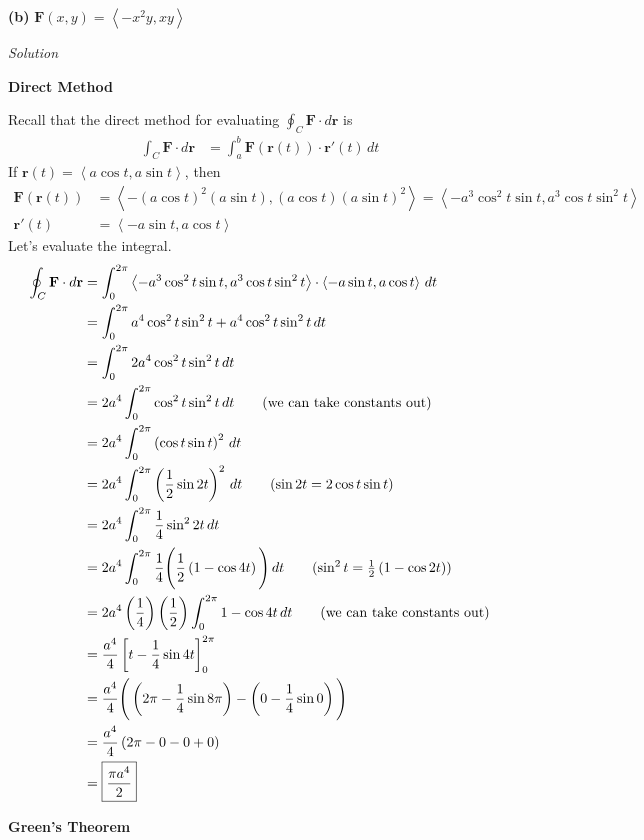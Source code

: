 \documentclass{article}
\newcommand{\lrp}[1]{\left( #1 \right)}
\newcommand{\lra}[1]{\left\langle #1 \right\rangle}
\newcommand{\lrb}[1]{\left[ #1 \right]}
\renewcommand{\r}[0]{\mathbf{r}}
\newcommand{\F}[0]{\mathbf{F}}
\newcommand{\Solution}{\textit{Solution}}
\begin{document}
{}\textbf{(b)} $\F(x,y)=\lra{-x^2y,xy}$

\Solution

{}\textbf{Direct Method}

Recall that the direct method for evaluating $\displaystyle \oint_C \F\cdot d\r$ is
\begin{align*}
    \int_C \F\cdot d\r&=\int_a^b \F\lrp{\r(t)}\cdot \r'(t)\,dt
\end{align*}
If $\r(t)=\lra{a\cos t, a\sin t}$, then
\begin{align*}
    \F\lrp{\r(t)}&=\lra{-\lrp{a\cos t}^2 \lrp{a\sin t}, \lrp{a\cos t}\lrp{a\sin t}^2}=\lra{-a^3\cos^2 t\sin t,a^3\cos t\sin^2t}\\
    \r'(t)&=\lra{-a\sin t,a \cos t}
\end{align*}
Let's evaluate the integral.
\begin{align*}
    \oint_C \F\cdot d\r&=\int_0^{2\pi}\lra{-a^3\cos^2 t\sin t,a^3\cos t\sin^2t}\cdot \lra{-a\sin t,a \cos t}\,dt\\
    &=\int_0^{2\pi} a^4\cos^2 t\sin^2 t + a^4 \cos^2t \sin^2t\,dt\\
    &=\int_0^{2\pi} 2a^4\cos^2 t\sin^2 t\,dt\\
    &=2a^4\int_0^{2\pi} \cos^2 t\sin^2 t\,dt\tag{we can take constants out}\\
    &=2a^4 \int_0^{2\pi}\lrp{\cos t\sin t}^2\,dt\\
    &=2a^4 \int_0^{2\pi} \lrp{\frac{1}{2}\sin 2t}^2 \,dt\tag{$\sin 2t = 2\cos t\sin t$}\\
    &=2a^4 \int_0^{2\pi} \frac{1}{4}\sin^2 2t\,dt\\
    &=2a^4 \int_0^{2\pi} \frac{1}{4}\Bigg(\frac{1}{2}\lrp{1-\cos 4t}\Bigg)\,dt\tag{$\sin^2 t = \frac{1}{2}\lrp{1-\cos 2t}$}\\
    &=2a^4\lrp{\frac{1}{4}}\lrp{\frac{1}{2}}\int_0^{2\pi}1-\cos 4t\,dt\tag{we can take constants out}\\
    &=\frac{a^4}{4}\lrb{t-\frac{1}{4}\sin 4t}_0^{2\pi}\\
    &=\frac{a^4}{4}\Bigg(\lrp{2\pi - \frac{1}{4}\sin 8\pi}-\lrp{0-\frac{1}{4}\sin 0}\Bigg)\\
    &=\frac{a^4}{4}\lrp{2\pi - 0 - 0 + 0}\\
    &=\boxed{\frac{\pi a^4}{2}}
\end{align*}
{}\textbf{Green's Theorem}
\end{document}
